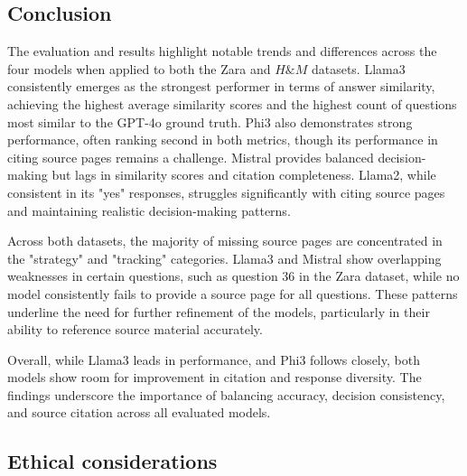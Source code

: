 \documentclass[]{article}
\begin{document}
\subsection{Conclusion}
The evaluation and results highlight notable trends and differences across the four models when applied to both the Zara and $H\&M$ datasets. 
Llama3 consistently emerges as the strongest performer in terms of answer similarity, achieving the highest average similarity scores and the highest count of questions most similar to the GPT-4o ground truth. 
Phi3 also demonstrates strong performance, often ranking second in both metrics, though its performance in citing source pages remains a challenge. Mistral provides balanced decision-making but lags in similarity scores and citation completeness. 
Llama2, while consistent in its "yes" responses, struggles significantly with citing source pages and maintaining realistic decision-making patterns.  

Across both datasets, the majority of missing source pages are concentrated in the "strategy" and "tracking" categories. 
Llama3 and Mistral show overlapping weaknesses in certain questions, such as question 36 in the Zara dataset, 
while no model consistently fails to provide a source page for all questions. These patterns underline the need for further refinement of the models, 
particularly in their ability to reference source material accurately.  

Overall, while Llama3 leads in performance, and Phi3 follows closely, 
both models show room for improvement in citation and response diversity. 
The findings underscore the importance of balancing accuracy, decision consistency, 
and source citation across all evaluated models.

\subsection{Ethical considerations}
\end{document}
